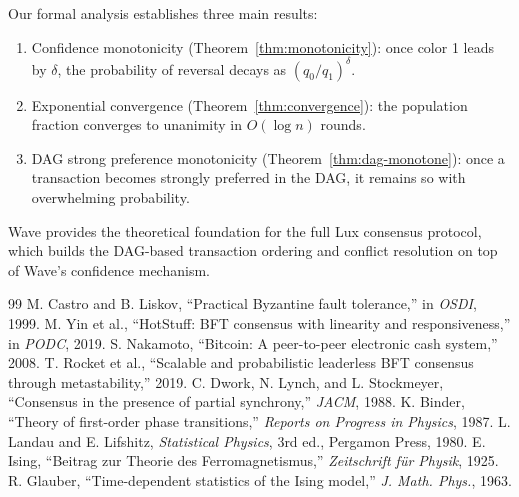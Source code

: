\documentclass[11pt,a4paper]{article}
\begin{document}
Our formal analysis establishes three main results:
\begin{enumerate}[nosep]
\item Confidence monotonicity (Theorem~\ref{thm:monotonicity}): once color 1 leads by
$\delta$, the probability of reversal decays as $(q_0/q_1)^\delta$.
\item Exponential convergence (Theorem~\ref{thm:convergence}): the population fraction
converges to unanimity in $O(\log n)$ rounds.
\item DAG strong preference monotonicity (Theorem~\ref{thm:dag-monotone}): once a
transaction becomes strongly preferred in the DAG, it remains so with overwhelming
probability.
\end{enumerate}

Wave provides the theoretical foundation for the full Lux consensus protocol,
which builds the DAG-based transaction ordering and conflict resolution on top of
Wave's confidence mechanism.

\begin{thebibliography}{99}
 M. Castro and B. Liskov, ``Practical Byzantine fault tolerance,'' in \emph{OSDI}, 1999.
 M. Yin et al., ``HotStuff: BFT consensus with linearity and responsiveness,'' in \emph{PODC}, 2019.
 S. Nakamoto, ``Bitcoin: A peer-to-peer electronic cash system,'' 2008.
 T. Rocket et al., ``Scalable and probabilistic leaderless BFT consensus through metastability,'' 2019.
 C. Dwork, N. Lynch, and L. Stockmeyer, ``Consensus in the presence of partial synchrony,'' \emph{JACM}, 1988.
 K. Binder, ``Theory of first-order phase transitions,'' \emph{Reports on Progress in Physics}, 1987.
 L. Landau and E. Lifshitz, \emph{Statistical Physics}, 3rd ed., Pergamon Press, 1980.
 E. Ising, ``Beitrag zur Theorie des Ferromagnetismus,'' \emph{Zeitschrift f\"ur Physik}, 1925.
 R. Glauber, ``Time-dependent statistics of the Ising model,'' \emph{J. Math. Phys.}, 1963.
\end{thebibliography}
\end{document}

